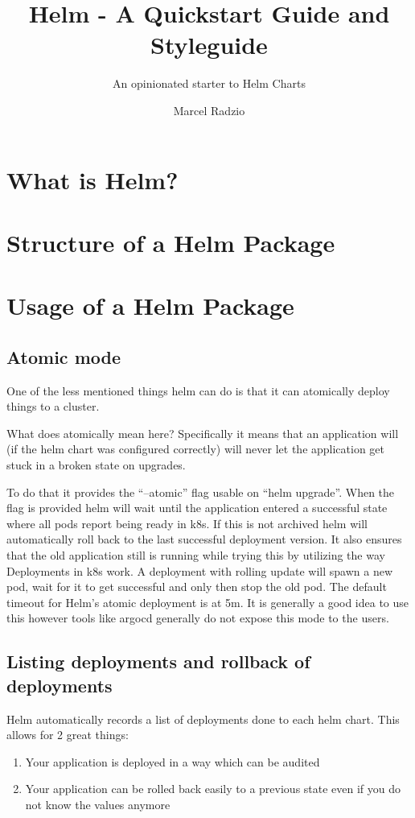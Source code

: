 \documentclass[english,10pt,a4paper]{scrreprt}
\title{Helm - A Quickstart Guide and Styleguide}
\subtitle{An opinionated starter to Helm Charts}
\author{Marcel Radzio}
\begin{document}
\maketitle
\tableofcontents

\chapter{What is Helm?}


\chapter{Structure of a Helm Package}


\chapter{Usage of a Helm Package}

\section{Atomic mode}
One of the less mentioned things helm can do is that it can atomically deploy things to a cluster.

What does atomically mean here?
Specifically it means that an application will (if the helm chart was configured correctly) will never let the application get stuck in a broken state on upgrades.

To do that it provides the \enquote{--atomic} flag usable on \enquote{helm upgrade}.
When the flag is provided helm will wait until the application entered a successful state where all pods report being ready in \Gls{k8s}.
If this is not archived helm will automatically roll back to the last successful deployment version.
It also ensures that the old application still is running while trying this by utilizing the way Deployments in \Gls{k8s} work.
A deployment with rolling update will spawn a new pod, wait for it to get successful and only then stop the old pod.
The default timeout for Helm's atomic deployment is at 5m.
It is generally a good idea to use this however tools like argocd generally do not expose this mode to the users.

\section{Listing deployments and rollback of deployments}
Helm automatically records a list of deployments done to each helm chart.
This allows for 2 great things:
\begin{enumerate}
  \item Your application is deployed in a way which can be audited
  \item Your application can be rolled back easily to a previous state even if you do not know the values anymore
\end{enumerate}
\end{document}
